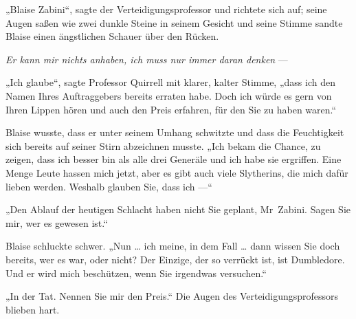 „Blaise Zabini“, sagte der Verteidigungsprofessor und richtete sich auf; seine Augen saßen wie zwei dunkle Steine in seinem Gesicht und seine Stimme sandte Blaise einen ängstlichen Schauer über den Rücken.

\emph{Er kann mir nichts anhaben, ich muss nur immer daran denken} —

„Ich glaube“, sagte Professor Quirrell mit klarer, kalter Stimme, „dass ich den Namen Ihres Auftraggebers bereits erraten habe. Doch ich würde es gern von Ihren Lippen hören und auch den Preis erfahren, für den Sie zu haben waren.“

Blaise wusste, dass er unter seinem Umhang schwitzte und dass die Feuchtigkeit sich bereits auf seiner Stirn abzeichnen musste.
„Ich bekam die Chance, zu zeigen, dass ich besser bin als alle drei Generäle und ich habe sie ergriffen. Eine Menge Leute hassen mich jetzt, aber es gibt auch viele Slytherins, die mich dafür lieben werden. Weshalb glauben Sie, dass ich —“

„Den Ablauf der heutigen Schlacht haben nicht Sie geplant, Mr~Zabini. Sagen Sie mir, wer es gewesen ist.“

Blaise schluckte schwer.
„Nun … ich meine, in dem Fall … dann wissen Sie doch bereits, wer es war, oder nicht? Der Einzige, der so verrückt ist, ist Dumbledore. Und er wird mich beschützen, wenn Sie irgendwas versuchen.“

„In der Tat. Nennen Sie mir den Preis.“ Die Augen des Verteidigungsprofessors blieben hart.

